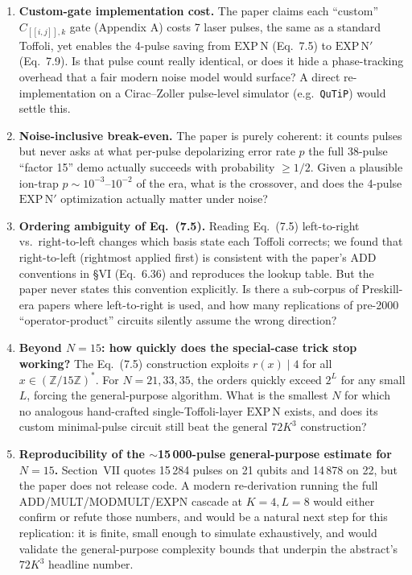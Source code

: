 \documentclass[11pt]{article}
\begin{document}
\begin{enumerate}
  \item[Q1.] \textbf{Custom-gate implementation cost.} The paper claims each
    ``custom'' $C_{[[i,j]],k}$ gate (Appendix A) costs 7 laser pulses, the
    same as a standard Toffoli, yet enables the 4-pulse saving from
    $\mathrm{EXP\,N}$ (Eq.~7.5) to $\mathrm{EXP\,N}'$ (Eq.~7.9). Is that pulse
    count really identical, or does it hide a phase-tracking overhead that a
    fair modern noise model would surface? A direct re-implementation on a
    Cirac--Zoller pulse-level simulator (e.g.\ \texttt{QuTiP}) would settle
    this.
  \item[Q2.] \textbf{Noise-inclusive break-even.} The paper is purely
    coherent: it counts pulses but never asks at what per-pulse depolarizing
    error rate $p$ the full 38-pulse ``factor 15'' demo actually succeeds
    with probability $\ge 1/2$. Given a plausible ion-trap $p \sim
    10^{-3}$--$10^{-2}$ of the era, what is the crossover, and does the
    4-pulse $\mathrm{EXP\,N}'$ optimization actually matter under noise?
  \item[Q3.] \textbf{Ordering ambiguity of Eq.~(7.5).} Reading Eq.~(7.5)
    left-to-right vs.\ right-to-left changes which basis state each Toffoli
    corrects; we found that right-to-left (rightmost applied first) is
    consistent with the paper's ADD conventions in \S VI (Eq.~6.36) and
    reproduces the lookup table. But the paper never states this
    convention explicitly. Is there a sub-corpus of Preskill-era papers where
    left-to-right is used, and how many replications of pre-2000
    ``operator-product'' circuits silently assume the wrong direction?
  \item[Q4.] \textbf{Beyond $N=15$: how quickly does the special-case trick
    stop working?} The Eq.~(7.5) construction exploits $r(x) \mid 4$ for all
    $x \in (\mathbb{Z}/15\mathbb{Z})^*$. For $N = 21, 33, 35$, the orders
    quickly exceed $2^L$ for any small $L$, forcing the general-purpose
    algorithm. What is the smallest $N$ for which no analogous hand-crafted
    single-Toffoli-layer $\mathrm{EXP\,N}$ exists, and does its custom
    minimal-pulse circuit still beat the general $72 K^3$ construction?
  \item[Q5.] \textbf{Reproducibility of the $\sim$15\,000-pulse general-purpose
    estimate for $N=15$.} Section~VII quotes 15\,284 pulses on 21 qubits and
    14\,878 on 22, but the paper does not release code. A modern
    re-derivation running the full ADD/MULT/MODMULT/EXPN cascade at
    $K=4, L=8$ would either confirm or refute those numbers, and would be a
    natural next step for this replication: it is finite, small enough to
    simulate exhaustively, and would validate the general-purpose complexity
    bounds that underpin the abstract's $72 K^3$ headline number.
\end{enumerate}
\end{document}
